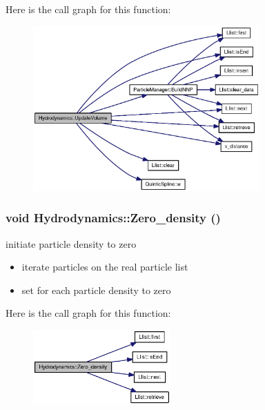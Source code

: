 Here is the call graph for this function:\nopagebreak
\begin{figure}[H]
\begin{center}
\leavevmode
\includegraphics[width=246pt]{classHydrodynamics_09a3f5a5c055e0efc822fdf80f40cd7d_cgraph}
\end{center}
\end{figure}
\hypertarget{classHydrodynamics_13810b3b4110a2b931bf7426af2f9bcf}{
\subsubsection[{Zero\_\-density}]{\setlength{\rightskip}{0pt plus 5cm}void Hydrodynamics::Zero\_\-density ()}}
\label{classHydrodynamics_13810b3b4110a2b931bf7426af2f9bcf}


initiate particle density to zero 



\begin{itemize}
\item iterate particles on the real particle list\end{itemize}


\begin{itemize}
\item set for each particle density to zero \end{itemize}


Here is the call graph for this function:\nopagebreak
\begin{figure}[H]
\begin{center}
\leavevmode
\includegraphics[width=149pt]{classHydrodynamics_13810b3b4110a2b931bf7426af2f9bcf_cgraph}
\end{center}
\end{figure}



